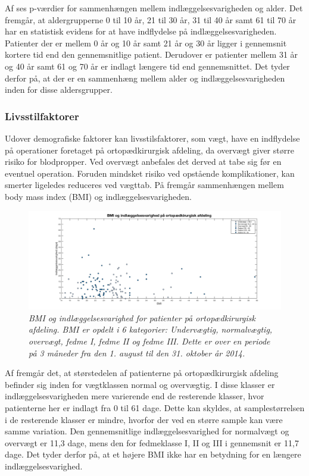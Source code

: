 \noindent
Af  ses p-værdier for sammenhængen mellem indlæggelsesvarigheden og alder. Det fremgår, at aldergrupperne 0 til 10 år, 21 til 30 år, 31 til 40 år samt 61 til 70 år har en statistisk evidens for at have indflydelse på indlæggelsesvarigheden. Patienter der er mellem 0 år og 10 år samt 21 år og 30 år ligger i gennemsnit kortere tid end den gennemsnitlige patient. Derudover er patienter mellem 31 år og 40 år samt 61 og 70 år er indlagt længere tid end gennemsnittet. Det tyder derfor på, at der er en sammenhæng mellem alder og indlæggelsesvarigheden inden for disse aldersgrupper.


\subsubsection{Livsstilfaktorer}
Udover demografiske faktorer kan livsstilsfaktorer, som vægt, have en indflydelse på operationer foretaget på ortopædkirurgisk afdeling, da overvægt giver større risiko for blodpropper\cite{Ermonds2004}. Ved overvægt anbefales det derved at tabe sig før en eventuel operation. Foruden mindsket risiko ved opstående komplikationer, kan smerter ligeledes reduceres ved vægttab.\cite{Nordjylland2014} På  fremgår sammenhængen mellem body mass index (BMI) og indlæggelsesvarigheden.

\begin{figure}[H]
	\centering
	\includegraphics[scale=0.35]{figures/BMIogindlaeg}
	\caption{\textit{BMI og indlæggelsesvarighed for patienter på ortopædkirurgisk afdeling. BMI er opdelt i 6 kategorier: Undervægtig, normalvægtig, overvægt, fedme I, fedme II og fedme III. Dette er over en periode på 3 måneder fra den 1. august til den 31. oktober år 2014.}}
	\label{BMIogindlaeggelse}
\end{figure}

\noindent
Af  fremgår det, at størstedelen af patienterne på ortopædkirurgisk afdeling befinder sig inden for vægtklassen normal og overvægtig. I disse klasser er indlæggelsesvarigheden mere varierende end de resterende klasser, hvor patienterne her er indlagt fra 0 til 61 dage. Dette kan skyldes, at samplestørrelsen i de resterende klasser er mindre, hvorfor der ved en større sample kan være samme variation. 
Den gennemsnitlige indlæggelsesvarighed for normalvægt og overvægt er 11,3 dage, mens den for fedmeklasse I, II og III i gennemsnit er 11,7 dage. Det tyder derfor på, at et højere BMI ikke har en betydning for en længere indlæggelsesvarighed. 



